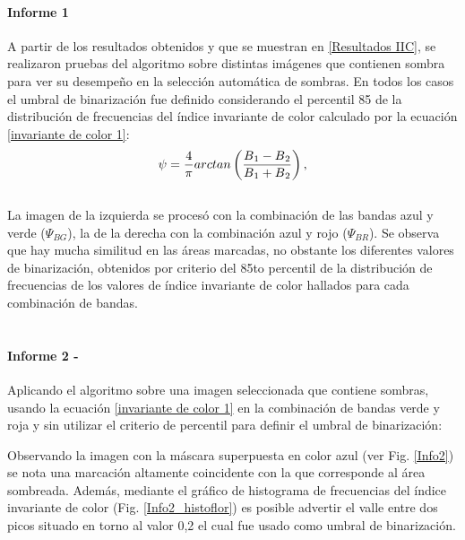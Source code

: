 \paragraph{Informe 1}
A partir de los resultados obtenidos y que se muestran en \ref{Resultados IIC}, se realizaron pruebas del algoritmo sobre distintas imágenes que contienen sombra para ver su desempeño en la selección automática de sombras. En todos los casos el umbral de binarización fue definido considerando el percentil 85 de la distribución de frecuencias del índice invariante de color calculado por la ecuación \ref{invariante de color 1}:
\\
\begin{equation}
	\psi=\frac{4}{\pi} arctan\left(\frac{B\textsubscript{1}-B\textsubscript{2}}{B\textsubscript{1}+B\textsubscript{2}}\right),\label{invariante de color 1}
\end{equation}
\\
La imagen de la izquierda se procesó con la combinación de las bandas azul y verde ($\Psi_{BG}$), la de la derecha con la combinación azul y rojo ($\Psi_{BR}$).
Se observa que hay mucha similitud en las áreas marcadas, no obstante los diferentes valores de binarización, obtenidos por criterio del 85to percentil de la distribución de frecuencias de los valores de índice invariante de color hallados para cada combinación de bandas.
\\
\\
\paragraph{Informe 2 - }
Aplicando el algoritmo sobre una imagen seleccionada que contiene sombras, usando la ecuación \ref{invariante de color 1} en la combinación de bandas verde y roja y sin utilizar el criterio de percentil para definir el umbral de binarización:

Observando la imagen con la máscara superpuesta en color azul (ver Fig. \ref{Info2}) se nota una marcación altamente coincidente con la que corresponde al área sombreada. Además, mediante el gráfico de histograma de frecuencias del índice invariante de color (Fig. \ref{Info2_histoflor}) es posible advertir el valle entre dos picos situado en torno al valor 0,2 el cual fue usado como umbral de binarización.

